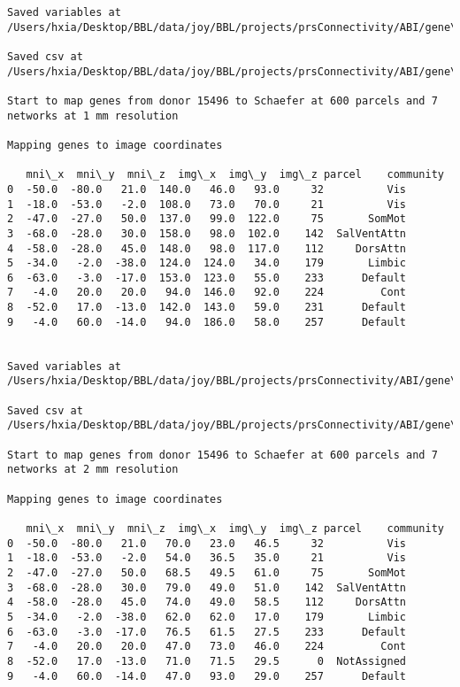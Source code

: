 \documentclass[11pt]{article}
\begin{document}
\begin{Verbatim}[commandchars=\\\{\}]
Saved variables at /Users/hxia/Desktop/BBL/data/joy/BBL/projects/prsConnectivity/ABI/gene\_mapping/15496donor\_400Parcels\_17Network\_2mm.pkl

Saved csv at /Users/hxia/Desktop/BBL/data/joy/BBL/projects/prsConnectivity/ABI/gene\_mapping/15496donor\_400Parcels\_17Network\_2mm.csv

Start to map genes from donor 15496 to Schaefer at 600 parcels and 7 networks at 1 mm resolution

Mapping genes to image coordinates

   mni\_x  mni\_y  mni\_z  img\_x  img\_y  img\_z parcel    community
0  -50.0  -80.0   21.0  140.0   46.0   93.0     32          Vis
1  -18.0  -53.0   -2.0  108.0   73.0   70.0     21          Vis
2  -47.0  -27.0   50.0  137.0   99.0  122.0     75       SomMot
3  -68.0  -28.0   30.0  158.0   98.0  102.0    142  SalVentAttn
4  -58.0  -28.0   45.0  148.0   98.0  117.0    112     DorsAttn
5  -34.0   -2.0  -38.0  124.0  124.0   34.0    179       Limbic
6  -63.0   -3.0  -17.0  153.0  123.0   55.0    233      Default
7   -4.0   20.0   20.0   94.0  146.0   92.0    224         Cont
8  -52.0   17.0  -13.0  142.0  143.0   59.0    231      Default
9   -4.0   60.0  -14.0   94.0  186.0   58.0    257      Default


Saved variables at /Users/hxia/Desktop/BBL/data/joy/BBL/projects/prsConnectivity/ABI/gene\_mapping/15496donor\_600Parcels\_7Network\_1mm.pkl

Saved csv at /Users/hxia/Desktop/BBL/data/joy/BBL/projects/prsConnectivity/ABI/gene\_mapping/15496donor\_600Parcels\_7Network\_1mm.csv

Start to map genes from donor 15496 to Schaefer at 600 parcels and 7 networks at 2 mm resolution

Mapping genes to image coordinates

   mni\_x  mni\_y  mni\_z  img\_x  img\_y  img\_z parcel    community
0  -50.0  -80.0   21.0   70.0   23.0   46.5     32          Vis
1  -18.0  -53.0   -2.0   54.0   36.5   35.0     21          Vis
2  -47.0  -27.0   50.0   68.5   49.5   61.0     75       SomMot
3  -68.0  -28.0   30.0   79.0   49.0   51.0    142  SalVentAttn
4  -58.0  -28.0   45.0   74.0   49.0   58.5    112     DorsAttn
5  -34.0   -2.0  -38.0   62.0   62.0   17.0    179       Limbic
6  -63.0   -3.0  -17.0   76.5   61.5   27.5    233      Default
7   -4.0   20.0   20.0   47.0   73.0   46.0    224         Cont
8  -52.0   17.0  -13.0   71.0   71.5   29.5      0  NotAssigned
9   -4.0   60.0  -14.0   47.0   93.0   29.0    257      Default



\end{Verbatim}
\end{document}

